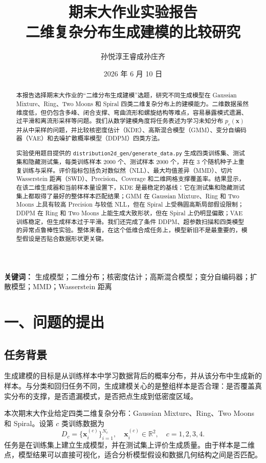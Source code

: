 \documentclass[a4paper,11pt]{article}
\title{\bfseries 期末大作业实验报告\\二维复杂分布生成建模的比较研究}
\author{孙悦淳\quad 王睿成\quad 孙庄齐\\}
\date{2026 年 6 月 10 日}
\newcommand{\templsection}[2]{%
  \setcounter{section}{#1}%
  \setcounter{subsection}{0}%
  \section*{#2}%
  \addcontentsline{toc}{section}{#2}%
}
\begin{document}
\maketitle

\begin{abstract}
本报告选择期末大作业的“二维分布生成建模”选题，研究不同生成模型在 Gaussian Mixture、Ring、Two Moons 和 Spiral 四类二维复杂分布上的建模能力。二维数据虽然维度低，但仍包含多峰、闭合支撑、弯曲流形和螺旋结构等难点，容易暴露模式遗漏、过平滑和离流形采样等问题。我们从数学建模角度将任务表述为学习未知分布 \(p_c(\mathbf{x})\) 并从中采样的问题，并比较核密度估计（KDE）、高斯混合模型（GMM）、变分自编码器（VAE）和去噪扩散概率模型（DDPM）四类方法。

实验使用题目提供的 \texttt{distribution2d\_gen/generate\_data.py} 生成四类训练集、测试集和隐藏测试集，每类训练样本 2000 个、测试样本 2000 个，并在 3 个随机种子上重复训练与采样。评价指标包括负对数似然（NLL）、最大均值差异（MMD）、切片 Wasserstein 距离（SWD）、Precision、Coverage 和二维网格支撑覆盖率。结果显示，在该二维生成器和当前样本量设置下，KDE 是最稳定的基线：它在测试集和隐藏测试集上都取得了最好的整体样本匹配结果；GMM 在 Gaussian Mixture、Ring 和 Two Moons 上具有较高 Precision 与较低 NLL，但在 Spiral 上受椭圆高斯局部假设限制；DDPM 在 Ring 和 Two Moons 上能生成大致形状，但在 Spiral 上仍明显偏散；VAE 训练稳定，但生成样本过于平滑。我们还完成了条件 DDPM、超参数扫描和四类模型的异常点鲁棒性实验。整体来看，在这个低维合成任务上，模型新旧不是最重要的，模型假设是否贴合数据形状更关键。
\end{abstract}

\textbf{关键词：} 生成模型；二维分布；核密度估计；高斯混合模型；变分自编码器；扩散模型；MMD；Wasserstein 距离

\clearpage

\templsection{1}{一、问题的提出}

\subsection{任务背景}

生成建模的目标是从训练样本中学习数据背后的概率分布，并从该分布中生成新的样本。与分类和回归任务不同，生成建模关心的是整组样本是否合理：是否覆盖真实分布的支撑，是否遗漏模式，是否把点生成到低密度区域。

本次期末大作业给定四类二维复杂分布：Gaussian Mixture、Ring、Two Moons 和 Spiral。设第 \(c\) 类训练数据为
\[
D_c=\{\mathbf{x}^{(c)}_i\}_{i=1}^{N_c},\quad \mathbf{x}^{(c)}_i\in\mathbb{R}^2,\quad c=1,2,3,4.
\]
任务是在训练集上建立生成模型，并在测试集上评价生成质量。由于样本是二维点，模型结果可以直接可视化，适合分析模型假设和数据几何结构之间是否匹配。
\end{document}
